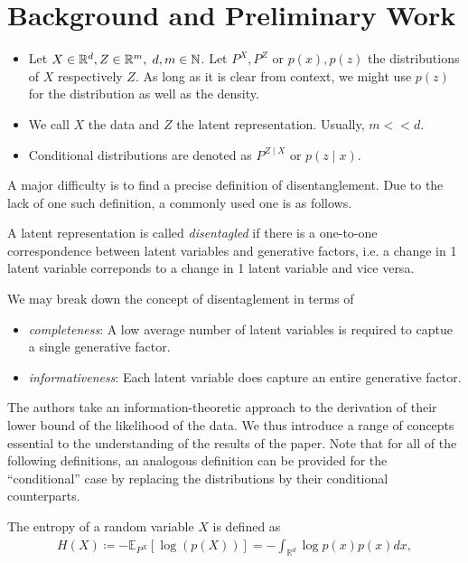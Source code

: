\documentclass[twoside,11pt]{article}
\newcommand{\N}{\mathbb{N}}
\newcommand{\R}{\mathbb{R}}
\begin{document}
\section{Background and Preliminary Work}
\begin{itemize}
  \item Let $X \in \R^{d}, Z \in \R^{m}, \hspace{0.1 cm} d,m \in \N$. Let $P^{X}, P^{Z}$ or $p(x), p(z)$ the distributions of $X$ respectively $Z$. As long as it is clear from context, we might use $p(z)$ for the distribution as well as the density.
  \item We call $X$ the data and $Z$ the latent representation. Usually, $m << d$.
  \item Conditional distributions are denoted as $P^{Z \mid X}$ or $p(z \mid x)$.
\end{itemize}
A major difficulty is to find a precise definition of disentanglement. Due to the lack of one such definition, a commonly used one is as follows.

\begin{definition}
  A latent representation is called \textit{disentagled} if there is a one-to-one correspondence between latent variables and generative factors, i.e. a change in 1 latent variable correponds to a change in 1 latent variable and vice versa.
\end{definition}
We may break down the concept of disentaglement in terms of
\begin{itemize}
  \item \textit{completeness}: A low average number of latent variables is required to captue a single generative factor.
  \item \textit{informativeness}: Each latent variable does capture an entire generative factor.
\end{itemize}
The authors take an information-theoretic approach to the derivation of their lower bound of the likelihood of the data. We thus introduce a range of concepts essential to the understanding of the results of the paper. Note that for all of the following definitions, an analogous definition can be provided for the \enquote{conditional} case by replacing the distributions by their conditional counterparts.

\begin{definition}
  The entropy of a random variable $X$ is defined as
  \begin{align*}
    H(X) \coloneqq - \mathbb{E}_{P^{X}}[\log(p(X))] = - \int_{\R^{d}}\log p(x)p(x) dx,
  \end{align*}
\end{definition}
\end{document}
